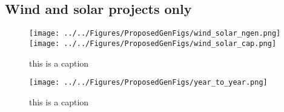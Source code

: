 \documentclass[11pt, oneside]{article}   	%
\begin{document}
\subsection{Wind and solar projects only}
\begin{figure}[ht]
\caption{this is a caption}
\texttt{[image: ../../Figures/ProposedGenFigs/wind\_solar\_ngen.png]}
\texttt{[image: ../../Figures/ProposedGenFigs/wind\_solar\_cap.png]}
\end{figure}

\begin{figure}
\caption{this is a caption}
\texttt{[image: ../../Figures/ProposedGenFigs/year\_to\_year.png]}
\end{figure}
\end{document}
